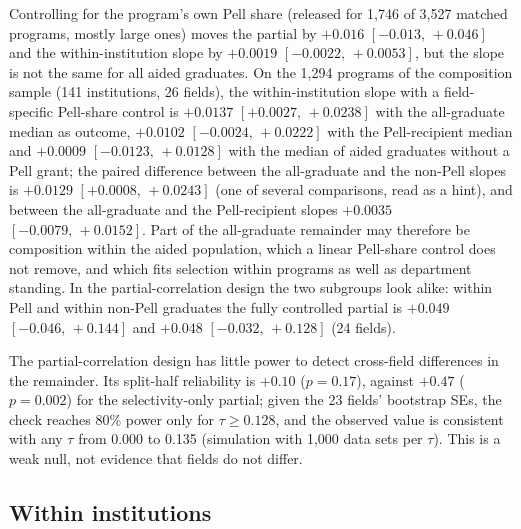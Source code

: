 \documentclass[11pt]{article}
\newcommand{\ci}[2]{$[#1,\allowbreak\,#2]$}
\begin{document}
Controlling for the program's own Pell share (released for 1,746 of 3,527 matched programs, mostly large ones)
moves the partial by $+0.016$ \ci{-0.013}{+0.046} and the within-institution slope by $+0.0019$
\ci{-0.0022}{+0.0053}, but the slope is not the same for all aided graduates. On the 1,294 programs of the
composition sample (141 institutions, 26 fields), the within-institution slope with a field-specific Pell-share
control is $+0.0137$ \ci{+0.0027}{+0.0238} with the all-graduate median as outcome, $+0.0102$ \ci{-0.0024}{+0.0222}
with the Pell-recipient median and $+0.0009$ \ci{-0.0123}{+0.0128} with the median of aided graduates without a Pell
grant; the paired difference between the all-graduate and the non-Pell slopes is $+0.0129$ \ci{+0.0008}{+0.0243}
(one of several comparisons, read as a hint), and between the all-graduate and the Pell-recipient slopes $+0.0035$
\ci{-0.0079}{+0.0152}. Part of the all-graduate remainder may therefore be composition
within the aided population, which a linear Pell-share control does not remove, and which fits selection within
programs as well as department standing. In the partial-correlation design the two subgroups look alike: within
Pell and within non-Pell graduates the fully controlled partial is $+0.049$ \ci{-0.046}{+0.144} and $+0.048$
\ci{-0.032}{+0.128} (24 fields).

The partial-correlation design has little power to detect cross-field differences in the remainder. Its
split-half reliability is $+0.10$ ($p=0.17$), against $+0.47$ ($p=0.002$) for the selectivity-only partial; given
the 23 fields' bootstrap SEs, the check reaches 80\% power only for $\tau\ge0.128$, and the observed value is
consistent with any $\tau$ from 0.000 to 0.135 (simulation with 1,000 data sets per $\tau$). This is a weak null,
not evidence that fields do not differ.

\subsection{Within institutions}\label{sec:fe}
\end{document}
